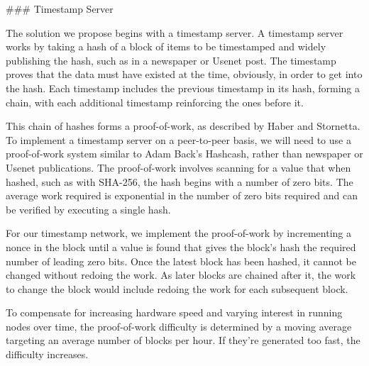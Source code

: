 ### Timestamp Server

The solution we propose begins with a timestamp server. A timestamp server works by taking a hash of a block of items to be timestamped and widely publishing the hash, such as in a newspaper or Usenet post. The timestamp proves that the data must have existed at the time, obviously, in order to get into the hash. Each timestamp includes the previous timestamp in its hash, forming a chain, with each additional timestamp reinforcing the ones before it.

This chain of hashes forms a proof-of-work, as described by Haber and Stornetta. To implement a timestamp server on a peer-to-peer basis, we will need to use a proof-of-work system similar to Adam Back's Hashcash, rather than newspaper or Usenet publications. The proof-of-work involves scanning for a value that when hashed, such as with SHA-256, the hash begins with a number of zero bits. The average work required is exponential in the number of zero bits required and can be verified by executing a single hash.

For our timestamp network, we implement the proof-of-work by incrementing a nonce in the block until a value is found that gives the block's hash the required number of leading zero bits. Once the latest block has been hashed, it cannot be changed without redoing the work. As later blocks are chained after it, the work to change the block would include redoing the work for each subsequent block.

To compensate for increasing hardware speed and varying interest in running nodes over time, the proof-of-work difficulty is determined by a moving average targeting an average number of blocks per hour. If they're generated too fast, the difficulty increases.